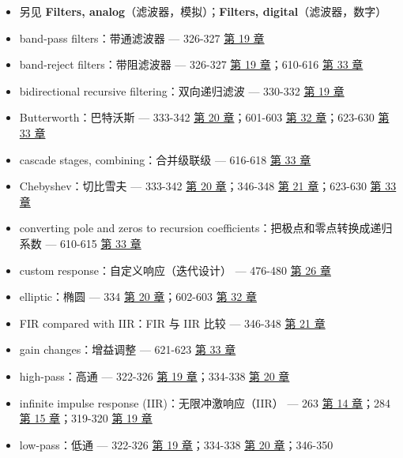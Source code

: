 \begin{itemize}
  \begin{itemize}
  \tightlist
  \item
    另见 \textbf{Filters, analog}（滤波器，模拟）；\textbf{Filters,
    digital}（滤波器，数字）
  \item
    band-pass filters：带通滤波器 --- 326-327 
    \hyperref[ch-19]{第 19 章}
  \item
    band-reject filters：带阻滤波器 --- 326-327 
    \hyperref[ch-19]{第 19 章}；610-616  \hyperref[ch-33]{第
    33 章}
  \item
    bidirectional recursive filtering：双向递归滤波 --- 330-332
     \hyperref[ch-19]{第 19 章}
  \item
    Butterworth：巴特沃斯 --- 333-342  \hyperref[ch-20]{第 20
    章}；601-603  \hyperref[ch-32]{第 32 章}；623-630
     \hyperref[ch-33]{第 33 章}
  \item
    cascade stages, combining：合并级联级 --- 616-618 
    \hyperref[ch-33]{第 33 章}
  \item
    Chebyshev：切比雪夫 --- 333-342  \hyperref[ch-20]{第 20
    章}；346-348  \hyperref[ch-21]{第 21 章}；623-630
     \hyperref[ch-33]{第 33 章}
  \item
    converting pole and zeros to recursion
    coefficients：把极点和零点转换成递归系数 --- 610-615 
    \hyperref[ch-33]{第 33 章}
  \item
    custom response：自定义响应（迭代设计） --- 476-480 
    \hyperref[ch-26]{第 26 章}
  \item
    elliptic：椭圆 --- 334  \hyperref[ch-20]{第 20
    章}；602-603  \hyperref[ch-32]{第 32 章}
  \item
    FIR compared with IIR：FIR 与 IIR 比较 --- 346-348 
    \hyperref[ch-21]{第 21 章}
  \item
    gain changes：增益调整 --- 621-623  \hyperref[ch-33]{第 33
    章}
  \item
    high-pass：高通 --- 322-326  \hyperref[ch-19]{第 19
    章}；334-338  \hyperref[ch-20]{第 20 章}
  \item
    infinite impulse response (IIR)：无限冲激响应（IIR） --- 263
     \hyperref[ch-14]{第 14 章}；284 
    \hyperref[ch-15]{第 15 章}；319-320  \hyperref[ch-19]{第
    19 章}
  \item
    low-pass：低通 --- 322-326  \hyperref[ch-19]{第 19
    章}；334-338  \hyperref[ch-20]{第 20 章}；346-350

\end{itemize}
\end{itemize}
